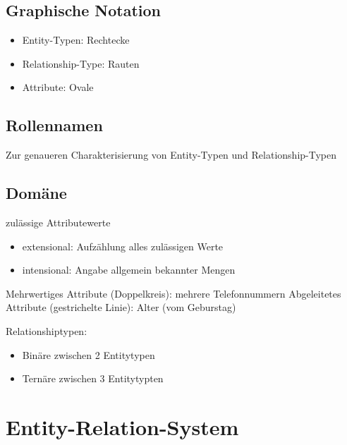\documentclass{lehramt-informatik-haupt}
\begin{document}
\subsection{Graphische Notation}

\begin{itemize}
\item Entity-Typen: Rechtecke
\item Relationship-Type: Rauten
\item Attribute: Ovale
\end{itemize}

\subsection{Rollennamen}

Zur genaueren Charakterisierung von Entity-Typen und Relationship-Typen

\subsection{Domäne}

zulässige Attributewerte

\begin{itemize}
\item extensional: Aufzählung alles zulässigen Werte
\item intensional: Angabe allgemein bekannter Mengen
\end{itemize}

Mehrwertiges Attribute (Doppelkreis): mehrere Telefonnummern
Abgeleitetes Attribute (gestrichelte Linie): Alter (vom Geburstag)

Relationshiptypen:

\begin{itemize}
\item Binäre zwischen 2 Entitytypen
\item Ternäre zwischen 3 Entitytypten
\end{itemize}

\section{Entity-Relation-System}
\end{document}
